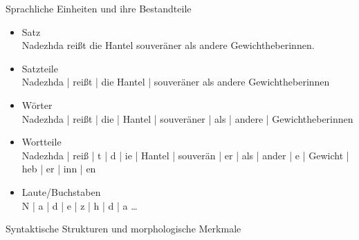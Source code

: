 \begin{frame}
  {Sprachliche Einheiten und ihre Bestandteile}
  \onslide<+->
  \begin{itemize}[<+->]
    \item\footnotesize \alert{Satz} \\
      {Nadezhda reißt die Hantel souveräner als andere Gewichtheberinnen.}
      \Halbzeile

    \item\footnotesize \alert{Satzteile} \\
      {Nadezhda | reißt | die Hantel | souveräner als andere Gewichtheberinnen}
      \Halbzeile

    \item\footnotesize \alert{Wörter} \\
      {Nadezhda | reißt | die | Hantel | souveräner | als | andere | Gewichtheberinnen}
      \Halbzeile

    \item\footnotesize \alert{Wortteile} \\
      {Nadezhda | reiß | t | d | ie | Hantel | souverän | er | als | ander | e | Gewicht | heb | er | inn | en}
      \Halbzeile

    \item\footnotesize \alert{Laute\slash Buchstaben} \\
      {N | a | d | e | z | h | d | a \ldots}
  \end{itemize}
\end{frame}


\begin{frame}
  {Syntaktische Strukturen und morphologische Merkmale}
  \onslide<+->
  \onslide<+->
  \begin{center}
  \end{center}

  \Zeile
   
\end{frame}

